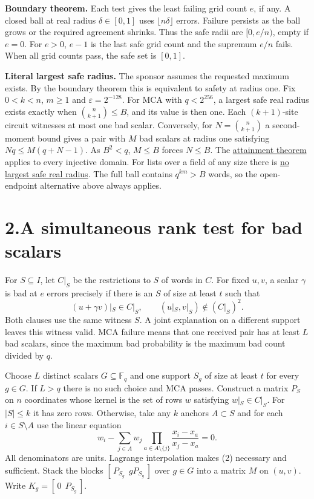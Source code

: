 \documentclass[11pt,letterpaper]{article}
\newcommand{\F}{\mathbb F_q}
\begin{document}
\textbf{Boundary theorem.} Each test gives the least failing grid count $e$, if any. A closed ball at real radius $\delta\in[0,1]$ uses $\lfloor n\delta\rfloor$ errors. Failure persists as the ball grows or the required agreement shrinks. Thus the safe radii are $[0,e/n)$, empty if $e=0$. For $e>0$, $e-1$ is the last safe grid count and the supremum $e/n$ fails. When all grid counts pass, the safe set is $[0,1]$.

\textbf{Literal largest safe radius.} The sponsor assumes the requested maximum exists. By the boundary theorem this is equivalent to safety at radius one. Fix $0<k<n$, $m\ge1$ and $\varepsilon=2^{-128}$. For MCA with $q<2^{256}$, a largest safe real radius exists exactly when $\binom{n}{k+1}\le B$, and its value is then one. Each $(k+1)$-site circuit witnesses at most one bad scalar. Conversely, for $N=\binom{n}{k+1}$ a second-moment bound gives a pair with $M$ bad scalars at radius one satisfying $Nq\le M(q+N-1)$. As $B^2<q$, $M\le B$ forces $N\le B$. The \href{https://github.com/SlopDotCash/proximityprize/blob/28d95ce2e7db421c464f85c9e984343f1c165863/ArkLib/Research/ProximityGap/JointAdjacentFieldReview.lean}{attainment theorem} applies to every injective domain. For lists over a field of any size there is \href{https://github.com/SlopDotCash/proximityprize/blob/28d95ce2e7db421c464f85c9e984343f1c165863/ArkLib/Research/ProximityGap/ListClosedForm.lean}{no largest safe real radius}. The full ball contains $q^{km}>B$ words, so the open-endpoint alternative above always applies.

\newpage
\section*{2.\quad A simultaneous rank test for bad scalars}
For $S\subseteq I$, let $C|_S$ be the restrictions to $S$ of words in $C$. For fixed $u,v$, a scalar $\gamma$ is bad at $e$ errors precisely if there is an $S$ of size at least $t$ such that
\[
 (u+\gamma v)|_S\in C|_S,\qquad
 (u|_S,v|_S)\notin (C|_S)^2.
 \tag{1}
\]
Both clauses use the same witness $S$. A joint explanation on a different support leaves this witness valid. MCA failure means that one received pair has at least $L$ bad scalars, since the maximum bad probability is the maximum bad count divided by $q$.

Choose $L$ distinct scalars $G\subseteq\F$ and one support $S_g$ of size at least $t$ for every $g\in G$. If $L>q$ there is no such choice and MCA passes. Construct a matrix $P_S$ on $n$ coordinates whose kernel is the set of rows $w$ satisfying $w|_S\in C|_S$. For $|S|\le k$ it has zero rows. Otherwise, take any $k$ anchors $A\subset S$ and for each $i\in S\setminus A$ use the linear equation
\[
  w_i-\sum_{j\in A}w_j\!
       \prod_{a\in A\setminus\{j\}}
       \frac{x_i-x_a}{x_j-x_a}=0 .
 \tag{2}
\]
All denominators are units. Lagrange interpolation makes (2) necessary and sufficient. Stack the blocks $[\,P_{S_g}\ \ gP_{S_g}\,]$ over $g\in G$ into a matrix $M$ on $(u,v)$. Write $K_g=[\,0\ \ P_{S_g}\,]$.
\end{document}
